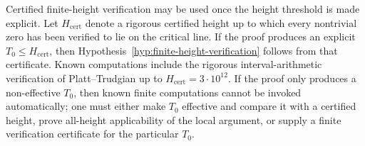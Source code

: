 \begin{remark}
\label{rem:finite-height-effectivity}
Certified finite-height verification may be used once the height threshold is
made explicit.  Let \(H_{\mathrm{cert}}\) denote a rigorous certified height up
to which every nontrivial zero has been verified to lie on the critical line.
If the proof produces an explicit \(T_0\le H_{\mathrm{cert}}\), then
Hypothesis~\ref{hyp:finite-height-verification} follows from that certificate.
Known computations include the rigorous interval-arithmetic verification of
Platt--Trudgian up to \(H_{\mathrm{cert}}=3\cdot10^{12}\).  If the proof only
produces a non-effective \(T_0\), then known finite computations cannot be
invoked automatically; one must either make \(T_0\) effective and compare it
with a certified height, prove all-height applicability of the local argument,
or supply a finite verification certificate for the particular \(T_0\).
\end{remark}

%
%
%
%
%
